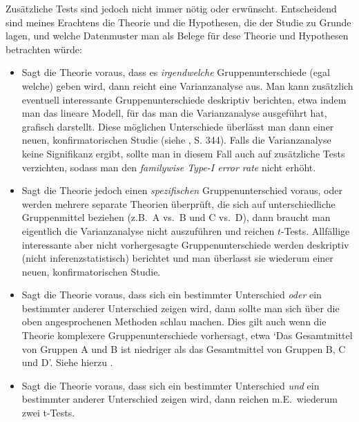\documentclass[oneside, 10pt]{book}\usepackage[]{graphicx}\usepackage[]{xcolor}
\begin{document}
Zusätzliche Tests sind jedoch nicht immer nötig
oder erwünscht. Entscheidend sind meines Erachtens
die Theorie und die Hypothesen, die der Studie zu
Grunde lagen, und welche Datenmuster man als
Belege für dese Theorie und Hypothesen betrachten
würde:

\begin{itemize}
\item Sagt die Theorie voraus, dass es \emph{irgendwelche}
Gruppenunterschiede (egal welche) geben wird, dann reicht eine
Varianzanalyse aus. Man kann zusätzlich eventuell interessante
Gruppenunterschiede deskriptiv berichten, etwa indem man
das lineare Modell, für das man die Varianzanalyse ausgeführt hat,
grafisch darstellt. Diese möglichen Unterschiede überlässt
man dann einer neuen, konfirmatorischen Studie (siehe \citealp{Bender2001}, S. 344).
Falls die Varianzanalyse keine Signifikanz ergibt,
sollte man in diesem Fall auch auf zusätzliche Tests verzichten,
sodass man den \textit{familywise Type-I error rate} nicht erhöht.

\item Sagt die Theorie jedoch einen \emph{spezifischen}
Gruppenunterschied voraus, oder werden mehrere separate Theorien
überprüft, die sich auf unterschiedliche Gruppenmittel beziehen
(z.B.\ A vs.\ B und C vs.\ D), dann braucht man eigentlich
die Varianzanalyse nicht auszuführen und reichen $t$-Tests.
Allfällige interessante aber nicht vorhergesagte Gruppenunterschiede
werden deskriptiv (nicht inferenzstatistisch) berichtet und man
überlasst sie wiederum einer neuen, konfirmatorischen Studie.

\item Sagt die Theorie voraus, dass sich ein bestimmter
Unterschied \emph{oder} ein bestimmter anderer Unterschied zeigen wird,
dann sollte man sich über die oben angesprochenen Methoden
schlau machen. Dies gilt auch wenn die Theorie komplexere
Gruppenunterschiede vorhersagt, etwa `Das Gesamtmittel von Gruppen A und B
ist niedriger als das Gesamtmittel von Gruppen B, C und D'.
Siehe hierzu \citet{Schad2020}.

\item Sagt die Theorie voraus, dass sich ein bestimmter Unterschied
\emph{und} ein bestimmter anderer Unterschied zeigen wird, dann reichen
m.E.\ wiederum zwei t-Tests.
\end{itemize}
\end{document}
